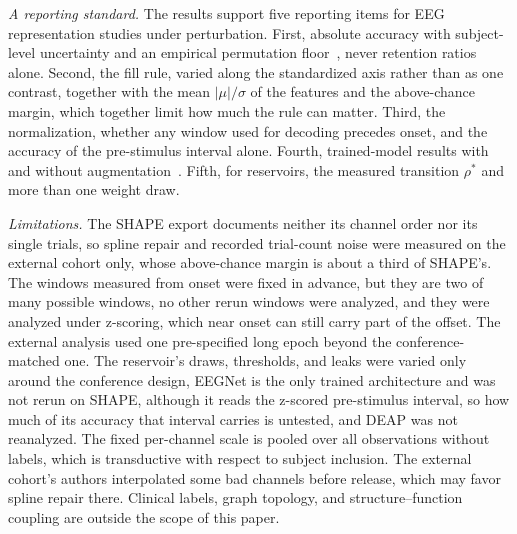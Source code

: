 \documentclass[journal]{IEEEtran}
\begin{document}
\emph{A reporting standard.} The results support five reporting items for EEG representation studies under perturbation. First, absolute accuracy with subject-level uncertainty and an empirical permutation floor~\cite{combrisson2015exceeding,varoquaux2018cross}, never retention ratios alone. Second, the fill rule, varied along the standardized axis rather than as one contrast, together with the mean $|\mu|/\sigma$ of the features and the above-chance margin, which together limit how much the rule can matter. Third, the normalization, whether any window used for decoding precedes onset, and the accuracy of the pre-stimulus interval alone. Fourth, trained-model results with and without augmentation~\cite{rommel2022augment}. Fifth, for reservoirs, the measured transition $\rho^\ast$ and more than one weight draw.

\emph{Limitations.} The SHAPE export documents neither its channel order nor its single trials, so spline repair and recorded trial-count noise were measured on the external cohort only, whose above-chance margin is about a third of SHAPE's. The windows measured from onset were fixed in advance, but they are two of many possible windows, no other rerun windows were analyzed, and they were analyzed under z-scoring, which near onset can still carry part of the offset. The external analysis used one pre-specified long epoch beyond the conference-matched one. The reservoir's draws, thresholds, and leaks were varied only around the conference design, EEGNet is the only trained architecture and was not rerun on SHAPE, although it reads the z-scored pre-stimulus interval, so how much of its accuracy that interval carries is untested, and DEAP was not reanalyzed. The fixed per-channel scale is pooled over all observations without labels, which is transductive with respect to subject inclusion. The external cohort's authors interpolated some bad channels before release, which may favor spline repair there. Clinical labels, graph topology, and structure--function coupling are outside the scope of this paper.
\end{document}
